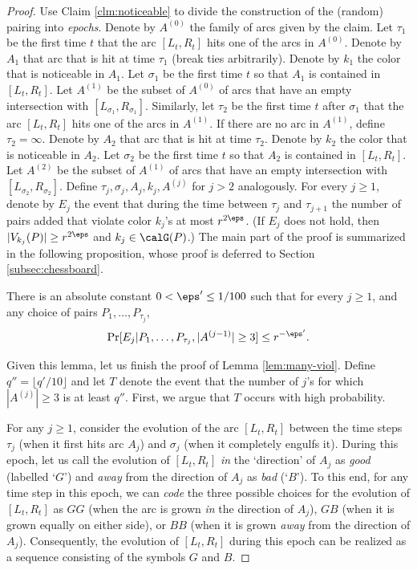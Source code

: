 \documentclass{article}
\begin{document}
\begin{proof}
Use Claim \ref{clm:noticeable} to divide the construction of the (random) pairing into \emph{epochs}. Denote by $A^{(0)}$
the family of arcs given by the claim. Let $\tau_1$ be the first time $t$ that the arc $[L_t
, R_t
]$ hits one of
the arcs in $A^{(0)}$. Denote by $A_1$ that arc that is hit at time $\tau_1$ (break ties arbitrarily). Denote by
$k_1$ the color that is noticeable in $A_1$. Let $\sigma_1$ be the first time $t$ so that $A_1$ is contained in $[L_t
, R_t
]$.
Let $A^{(1)}$ be the subset of $A^{(0)}$ of arcs that have an empty intersection with $[L_{\sigma_1}
, R_{\sigma_1}
]$. Similarly,
let $\tau_2$ be the first time $t$ after $ \sigma_1$ that the arc $[L_t
, R_t
]$ hits one of the arcs in $A^{(1)}$. If there are no
arc in $A^{(1)}$, define $\tau_2 = \infty$. Denote by $A_2$ that arc that is hit at time $\tau_2$. Denote by $k_2$ the color that
is noticeable in $A_2$. 
Let $\sigma_2$ be the first time $t$ so that $A_2$ is contained in $[L_t, R_t]$. 
Let $A^{(2)}$ be the subset of $A^{(1)}$ of arcs that have an empty intersection with $[L_{\sigma_2}, R_{\sigma_2}]$. 
Define $\tau_j , \sigma_j , A_j , k_j, A^{(j)}$ for $j > 2$ analogously.
For every $j \geq 1$, denote by $E_j$ the event that during the time between $\tau_j$ and $\tau_{j+1}$ the number of
pairs added that violate color $k_j$'s at most $r^{2\eps}$. (If $E_j$ does not hold, then $|V_{k_j}
(P)| \geq r^{2\eps}$ and $k_j\in \calG(P)$.) 
The main part of the proof is summarized in the following proposition, whose proof is deferred to
Section \ref{subsec:chessboard}.

\begin{lem}\label{lem:chessboard}
There is an absolute constant $0<\eps'\leq 1/100$ such that for every $j \geq 1$, and any choice of pairs $P_1,\ldots,P_{\tau_j}$,
\[\Pr[E_j|P_1,\ldots, P_{\tau_j}, |A^{(j-1)}| \geq 3]\leq r^{-\eps'}.\]
\end{lem}

Given this lemma, let us finish the proof of Lemma \ref{lem:many-viol}. Define $q'' = \lfloor q'/10 \rfloor$ and let $T$ denote the event that the number of $j$'s for which $|A^{(j)}|\geq 3$ is at least $q''$. First, we argue that $T$ occurs with high probability. 

For any $j\geq 1$, consider the evolution of the arc $[L_t,R_t]$ between the time steps $\tau_j$ (when it first hits arc $A_j$) and $\sigma_j$ (when it completely engulfs it). During this epoch, let us call the evolution of $[L_t,R_t]$ \emph{in} the `direction' of $A_j$ as \emph{good} (labelled `$G$') and \emph{away} from the direction of $A_j$ as \emph{bad} (`$B$'). To this end, for any time step in this epoch, we can \emph{code} the three possible choices for the evolution of $[L_t,R_t]$ as $GG$ (when the arc is grown \emph{in} the direction of $A_j$), $GB$ (when it is grown equally on either side), or $BB$ (when it is grown \emph{away} from the direction of $A_j$). Consequently, the evolution of $[L_t,R_t]$ during this epoch can be realized as a sequence consisting of the symbols $G$ and $B$.


\end{proof}
\end{document}
